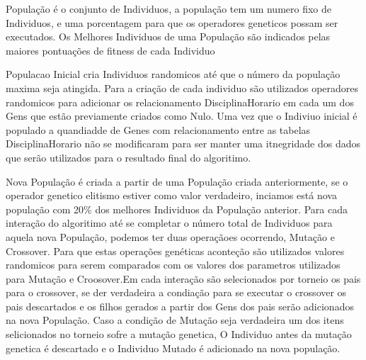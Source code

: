 \documentclass{abntpuc}
\begin{document}

População é o conjunto de Individuos, a população tem um numero fixo de Individuos, e uma porcentagem para que os operadores geneticos possam ser executados. Os Melhores Individuos de uma População são indicados pelas maiores pontuações de fitness de cada Individuo\par

Populacao Inicial cria Individuos randomicos até que o número da população maxima seja atingida. Para a criação de cada individuo são utilizados operadores randomicos para adicionar os relacionamento DisciplinaHorario em cada um dos Gens que estão previamente criados como Nulo. Uma vez que o Indiviuo inicial é populado a quandiadde de Genes com relacionamento entre as tabelas DisciplinaHorario não se modificaram para ser manter uma itnegridade dos dados que serão utilizados para o resultado final do algoritimo.\par

Nova População é criada a partir de uma População criada anteriormente, se o operador genetico elitismo estiver como valor verdadeiro, inciamos está nova população com 20\% dos melhores Individuos da População anterior. Para cada interação do algoritimo até se completar o número total de Individuos para aquela nova População, podemos ter duas operaçãoes ocorrendo, Mutação e Crossover. Para que estas operações genéticas aconteção são utilizados valores randomicos para serem comparados com os valores dos parametros utilizados para Mutação e Croosover.Em cada interação são selecionados por torneio os pais para o crossover, se der verdadeira a condiação para se executar o crossover os pais descartados e os filhos gerados a partir dos Gens dos pais serão adicionados na nova População. Caso a condição de Mutação seja verdadeira um dos itens selicionados no torneio sofre a mutação genetica, O Individuo antes da mutação genetica é descartado e o Individuo Mutado é adicionado na nova população.
\par
\end{document}
